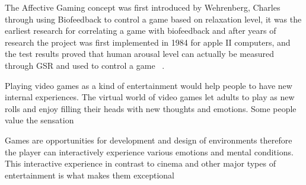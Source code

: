 
The Affective Gaming concept was first introduced by Wehrenberg, Charles through using Biofeedback to control a game based on relaxation level, it was the earliest research for correlating a game with biofeedback and after years of research the project was first implemented in 1984 for apple II computers, and the test results proved that human arousal level can actually be measured through GSR and used to control a game  ~\cite{wehrenberg1995willball}.


Playing video games as a kind of entertainment would help people to have new internal
experiences. The virtual world of video games let adults to play as new rolls and enjoy filling
their heads with new thoughts and emotions. Some people value
the sensation

Games are opportunities for development and design of environments therefore
the player can interactively experience various emotions and mental conditions.
This interactive experience in contrast to cinema
and other major types of entertainment is what makes them exceptional

